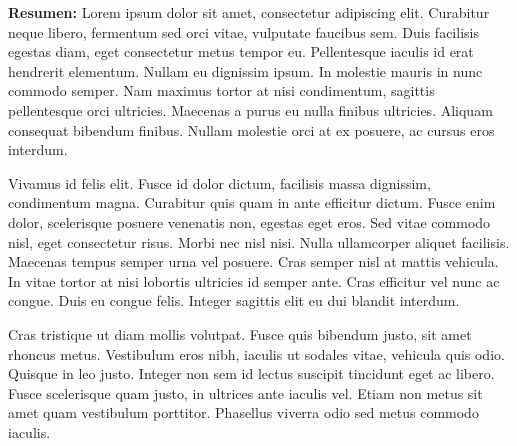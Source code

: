 \textbf{Resumen:} Lorem ipsum dolor sit amet, consectetur adipiscing elit. Curabitur neque libero, fermentum sed orci vitae, vulputate faucibus sem. Duis facilisis egestas diam, eget consectetur metus tempor eu. Pellentesque iaculis id erat hendrerit elementum. Nullam eu dignissim ipsum. In molestie mauris in nunc commodo semper. Nam maximus tortor at nisi condimentum, sagittis pellentesque orci ultricies. Maecenas a purus eu nulla finibus ultricies. Aliquam consequat bibendum finibus. Nullam molestie orci at ex posuere, ac cursus eros interdum.

Vivamus id felis elit. Fusce id dolor dictum, facilisis massa dignissim, condimentum magna. Curabitur quis quam in ante efficitur dictum. Fusce enim dolor, scelerisque posuere venenatis non, egestas eget eros. Sed vitae commodo nisl, eget consectetur risus. Morbi nec nisl nisi. Nulla ullamcorper aliquet facilisis. Maecenas tempus semper urna vel posuere. Cras semper nisl at mattis vehicula. In vitae tortor at nisi lobortis ultricies id semper ante. Cras efficitur vel nunc ac congue. Duis eu congue felis. Integer sagittis elit eu dui blandit interdum.

Cras tristique ut diam mollis volutpat. Fusce quis bibendum justo, sit amet rhoncus metus. Vestibulum eros nibh, iaculis ut sodales vitae, vehicula quis odio. Quisque in leo justo. Integer non sem id lectus suscipit tincidunt eget ac libero. Fusce scelerisque quam justo, in ultrices ante iaculis vel. Etiam non metus sit amet quam vestibulum porttitor. Phasellus viverra odio sed metus commodo iaculis.
